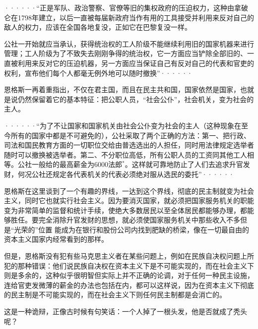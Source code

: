 {······“正是军队、政治警察、官僚等旧的集权政府的压迫权力，这种由拿破仑在1798年建立，以后一直被每届新政府当作有用的工具接受并利用来反对自己的敌人的权力，应该在全国各地复没，正如它在巴黎复没一样。

公社一开始就应当承认，获得统治权的工人阶级不能继续利用旧的国家机器来进行管理；工人阶级为了不致失去刚刚争得的统治权，它一方面应当铲除全部旧的、一直被利用来反对它的压迫机器，另一方面应当保证自己有反对自己的代表和官吏的权利，宣布他们每个人都毫无例外地可以随时撤换”······

\leftskip=0mm
\normalsize
\pskip

恩格斯一再着重指出，不仅在君主国，而且在{\kaishu 民主共和国}，国家依然是国家，也就是说仍然保留着它的基本特征：把公职人员，“社会公仆”，社会机关，变为社会的{\kaishu 主人}。

\pskip
\small
\leftskip=10mm

······“为了不让国家和国家机关由社会公仆变为社会的主人（这种现象在至今所有的国家中都是不可避免的），公社采取了两个正确的方法：第一、把行政、司法和国民教育方面的一切职位交给由普选选出的人担任，同时用法律规定选举者随时可以撤换被选举者。第二、不分职位高低，所有公职人员的工资同其他工人相等。公社一般给的最高薪金为6000法郎$^{*}$。这样就可靠地防止了人们去追求升官发财，何况公社还规定各代表机关的代表必须绝对服从选民的委托”······

\leftskip=0mm
\normalsize
\pskip

恩格斯在这里谈到了一个有趣的界线，一达到这个界线，彻底的民主制就变为社会主义，同时它也就实行社会主义。因为要消灭国家，就必须把国家服务机关的职能变为非常简单的监督和统计手续，使绝大多数居民以至全体居民都能够办理，都能够胜任。要完全消除升官发财的思想，就必须使国家服务机关中那些收入不多但是“光荣的”位置 能成为在银行和股份公司内找到肥缺的桥梁，像在一切最自由的资本主义国家内{\kaishu 经常}看到的那样。

但是，恩格斯没有犯有些马克思主义者在某些问题上，例如在民族自决权问题上所犯的那种错误：他们说民族自决权在资本主义下是不可能实现的，而在社会主义下则是多余的，这种似乎很明智但实际上并不正确的论调，对于{\kaishu 任何一种}民主设施，连给官吏发微薄的薪金的办法也包括在内，都可以这样说，因为在资本主义下彻底的民主制是不可能实现的，而在社会主义下则任何民主制都是会{\kaishu 消亡}的。

这是一种诡辩，正像古时候有句笑话：一个人掉了一根头发，他是否就成了秃头呢？

}
